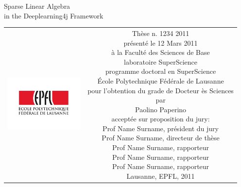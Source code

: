 \begin{titlepage}
\begin{center}
\sffamily

 
\null\vspace{2cm}
{\huge Sparse Linear Algebra \\[12pt] in the Deeplearning4j Framework } \\[24pt] 

\vfill

\begin{tabular} {cc}
\parbox{0.3\textwidth}{\includegraphics[width=4cm]{images/epfl}}
&
\parbox{0.7\textwidth}{%
	Thèse n. 1234 2011\\
	présenté le 12 Mars 2011\\
	à la Faculté des Sciences de Base\\
	laboratoire SuperScience\\
	programme doctoral en SuperScience\\
%
	École Polytechnique Fédérale de Lausanne\\[6pt]
	pour l'obtention du grade de Docteur ès Sciences\\
	par\\ [4pt]
	\null \hspace{3em} Paolino Paperino\\[9pt]
%
\small
acceptée sur proposition du jury:\\[4pt]
%
    Prof Name Surname, président du jury\\
    Prof Name Surname, directeur de thèse\\
    Prof Name Surname, rapporteur\\
    Prof Name Surname, rapporteur\\
    Prof Name Surname, rapporteur\\[12pt]
%
Lausanne, EPFL, 2011}
\end{tabular}
\end{center}
\vspace{2cm}
\end{titlepage}




